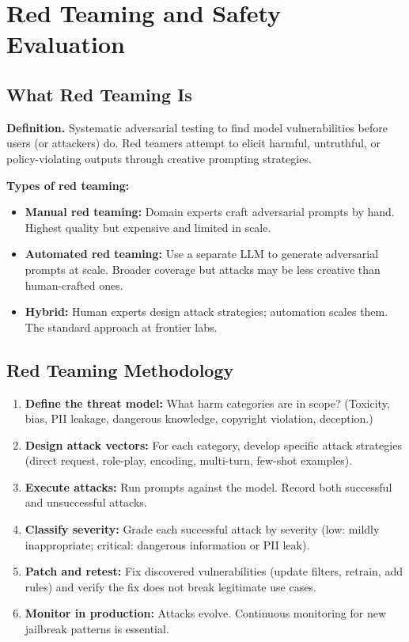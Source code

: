 \section{Red Teaming and Safety Evaluation}
\label{sec:red_teaming}

\subsection{What Red Teaming Is}

\textbf{Definition.} Systematic adversarial testing to find model vulnerabilities before users (or attackers) do. Red teamers attempt to elicit harmful, untruthful, or policy-violating outputs through creative prompting strategies.

\textbf{Types of red teaming:}
\begin{itemize}
    \item \textbf{Manual red teaming:} Domain experts craft adversarial prompts by hand. Highest quality but expensive and limited in scale.
    \item \textbf{Automated red teaming:} Use a separate LLM to generate adversarial prompts at scale. Broader coverage but attacks may be less creative than human-crafted ones.
    \item \textbf{Hybrid:} Human experts design attack strategies; automation scales them. The standard approach at frontier labs.
\end{itemize}

\subsection{Red Teaming Methodology}

\begin{enumerate}
    \item \textbf{Define the threat model:} What harm categories are in scope? (Toxicity, bias, PII leakage, dangerous knowledge, copyright violation, deception.)
    \item \textbf{Design attack vectors:} For each category, develop specific attack strategies (direct request, role-play, encoding, multi-turn, few-shot examples).
    \item \textbf{Execute attacks:} Run prompts against the model. Record both successful and unsuccessful attacks.
    \item \textbf{Classify severity:} Grade each successful attack by severity (low: mildly inappropriate; critical: dangerous information or PII leak).
    \item \textbf{Patch and retest:} Fix discovered vulnerabilities (update filters, retrain, add rules) and verify the fix does not break legitimate use cases.
    \item \textbf{Monitor in production:} Attacks evolve. Continuous monitoring for new jailbreak patterns is essential.
\end{enumerate}

